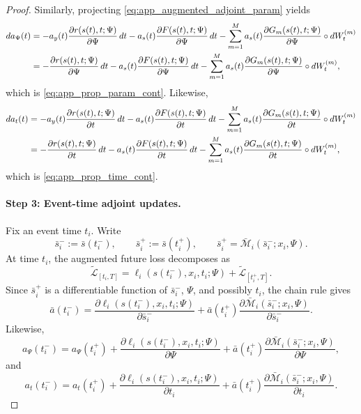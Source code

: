\documentclass[11pt]{article}
\theoremstyle{definition}
\numberwithin{equation}{section}
\numberwithin{theorem}{section}
\numberwithin{proposition}{section}
\numberwithin{lemma}{section}
\numberwithin{corollary}{section}
\numberwithin{definition}{section}
\numberwithin{remark}{section}
\newcommand{\1}{\mathbbm{1}}
\begin{document}
\begin{proof}
Similarly, projecting \eqref{eq:app_augmented_adjoint_param} yields
\begin{align}
da_\Psi(t)
&=
-a_y(t)\frac{\partial r(s(t),t;\Psi)}{\partial \Psi}\,dt
-a_s(t)\frac{\partial F(s(t),t;\Psi)}{\partial \Psi}\,dt
-\sum_{m=1}^M a_s(t)\frac{\partial G_m(s(t),t;\Psi)}{\partial \Psi}\circ dW_t^{(m)}
\notag\\
&=
-\frac{\partial r(s(t),t;\Psi)}{\partial \Psi}\,dt
-a_s(t)\frac{\partial F(s(t),t;\Psi)}{\partial \Psi}\,dt
-\sum_{m=1}^M a_s(t)\frac{\partial G_m(s(t),t;\Psi)}{\partial \Psi}\circ dW_t^{(m)},
\end{align}
which is \eqref{eq:app_prop_param_cont}. Likewise,
\begin{align}
da_t(t)
&=
-a_y(t)\frac{\partial r(s(t),t;\Psi)}{\partial t}\,dt
-a_s(t)\frac{\partial F(s(t),t;\Psi)}{\partial t}\,dt
-\sum_{m=1}^M a_s(t)\frac{\partial G_m(s(t),t;\Psi)}{\partial t}\circ dW_t^{(m)}
\notag\\
&=
-\frac{\partial r(s(t),t;\Psi)}{\partial t}\,dt
-a_s(t)\frac{\partial F(s(t),t;\Psi)}{\partial t}\,dt
-\sum_{m=1}^M a_s(t)\frac{\partial G_m(s(t),t;\Psi)}{\partial t}\circ dW_t^{(m)},
\end{align}
which is \eqref{eq:app_prop_time_cont}.

\paragraph{Step 3: Event-time adjoint updates.}
Fix an event time $t_i$. Write
\[
\bar s_i^-:=\bar s(t_i^-), \qquad \bar s_i^+:=\bar s(t_i^+),
\qquad
\bar s_i^+=\bar{\mathcal M}_i(\bar s_i^-;x_i,\Psi).
\]
At time $t_i$, the augmented future loss decomposes as
\begin{equation}
\label{eq:app_event_loss_augmented}
\tilde{\mathcal L}_{[t_i,T]}
=
\ell_i(s(t_i^-),x_i,t_i;\Psi)
+
\tilde{\mathcal L}_{[t_i^+,T]}.
\end{equation}
Since $\bar s_i^+$ is a differentiable function of $\bar s_i^-$, $\Psi$, and possibly $t_i$, the chain rule gives
\begin{equation}
\label{eq:app_event_state_jump_augmented}
\bar a(t_i^-)
=
\frac{\partial \ell_i(s(t_i^-),x_i,t_i;\Psi)}{\partial \bar s_i^-}
+
\bar a(t_i^+)
\frac{\partial \bar{\mathcal M}_i(\bar s_i^-;x_i,\Psi)}{\partial \bar s_i^-}.
\end{equation}
Likewise,
\begin{equation}
\label{eq:app_event_param_jump_augmented}
a_\Psi(t_i^-)
=
a_\Psi(t_i^+)
+
\frac{\partial \ell_i(s(t_i^-),x_i,t_i;\Psi)}{\partial \Psi}
+
\bar a(t_i^+)
\frac{\partial \bar{\mathcal M}_i(\bar s_i^-;x_i,\Psi)}{\partial \Psi},
\end{equation}
and
\begin{equation}
\label{eq:app_event_time_jump_augmented}
a_t(t_i^-)
=
a_t(t_i^+)
+
\frac{\partial \ell_i(s(t_i^-),x_i,t_i;\Psi)}{\partial t_i}
+
\bar a(t_i^+)
\frac{\partial \bar{\mathcal M}_i(\bar s_i^-;x_i,\Psi)}{\partial t_i}.
\end{equation}


\end{proof}
\end{document}
